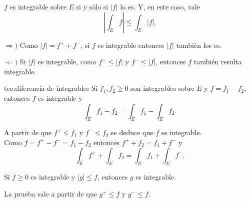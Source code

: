                     \begin{teorema}{}
                    $f$ es integrable sobre $E$ si y s\'olo si $|f|$ lo es.  Y, en este caso, vale
                    \[
                    \left|\int_E f\right|\leq \int_E |f|.
                    \]
                    \end{teorema}
                    
                    \begin{demo}
                    $\Rightarrow)$
                    Como $|f|=f^++f^-$, si $f$ es integrable entonces $|f|$ tambi\'en los es. 
                    
                    $\Leftarrow)$
                    Si $|f|$ es integrable, como $f^+\leq |f|$ y $f^-\leq |f|$, entonces $f$ tambi\'en resulta integrable.
                    \end{demo}
                    
                    \begin{teorema}{teo:diferencia-de-integrables}
                    Si $f_1,f_2\geq 0$ son integrables sobre $E$ y $f=f_1-f_2$, entonces $f$ es integrable y 
                    \[\int_E f_1-f_2 = \int_E f_1 - \int_E f_2.\]
                    \end{teorema}
                    
                    \begin{demo}
                    A partir de  que $f^+\leq f_1$ y $f^-\leq f_2$ se deduce que $f$ es integrable.  
                    \\
                    Como $f=f^+-f^-=f_1-f_2$ entonces 
                    $f^+ + f_2=f_1 + f^-$ y 
                    \[
                    \int_E f^+ + \int_E f_2=
                    \int_E f_1 + \int_E f^-.
                    \]
                    \end{demo}
                    
                    \begin{teorema}{}
                    Si $f\geq 0$ es integrable y $|g|\leq f$, entonces $g$ es integrable. 
                    \end{teorema}
                    
                    \begin{demo}
                     La prueba sale a partir de que 
                    $g^+\leq f$ y $g^- \leq f$.
                    \end{demo}
                   
